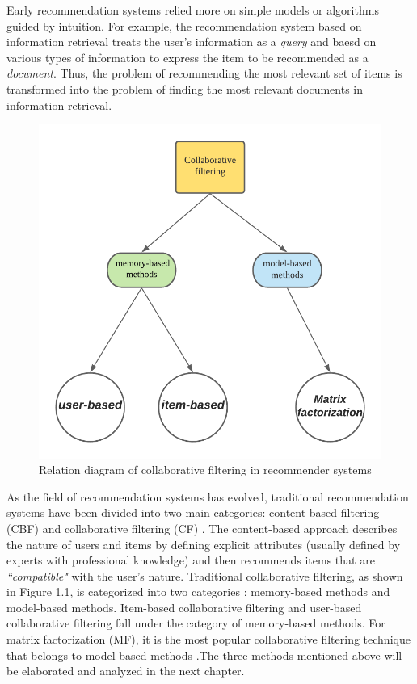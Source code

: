 Early recommendation systems relied more on simple models or algorithms guided by intuition. For example, the recommendation system based on information retrieval treats the user's information as a \textit{query} and baesd on various types of information to express the item to be recommended as a \textit{document}. Thus, the problem of recommending the most relevant set of items is transformed into the problem of finding the most relevant documents in information retrieval.
\begin{figure}[htbp]
\centering
\includegraphics[scale=0.7]{figure/cfr.png}
\caption{Relation diagram of collaborative filtering in recommender systems}
\end{figure}
As the field of recommendation systems has evolved, traditional recommendation systems have been divided into two main categories: content-based filtering (CBF) and collaborative filtering (CF) \cite{cf1999}. The content-based approach describes the nature of users and items by defining explicit attributes (usually defined by experts with professional knowledge) and then recommends items that are \textit{``compatible"} with the user's nature. Traditional collaborative filtering, as shown in Figure 1.1, is categorized into two categories \cite{1423975}: memory-based methods and model-based methods. Item-based collaborative filtering and user-based collaborative filtering fall under the category of memory-based methods. For matrix factorization (MF), it is the most popular collaborative filtering technique that belongs to model-based methods \cite{convMF}.The three methods mentioned above will be elaborated and analyzed in the next chapter.

